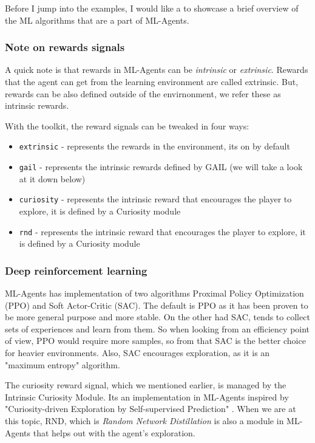 \documentclass[a4paper, 12pt]{book}
\begin{document}
Before I jump into the examples, I would like a to showcase a brief overview of the ML algorithms that are a part of ML-Agents.

\subsubsection{Note on rewards signals}

A quick note is that rewards in ML-Agents can be \emph{intrinsic} or \emph{extrinsic}. Rewards that the agent can get from the learning environment are called extrinsic. But, rewards can be also defined outside of the envirnonment, we refer these as intrinsic rewards.

With the toolkit, the reward signals can be tweaked in four ways:
\begin{itemize}
    \item \texttt{extrinsic} - represents the rewards in the environment, its on by default
    \item \texttt{gail} - represents the intrinsic rewards defined by GAIL (we will take a look at it down below)
    \item \texttt{curiosity} - represents the intrinsic reward that encourages the player to explore, it is defined by a Curiosity module
    \item \texttt{rnd} - represents the intrinsic reward that encourages the player to explore, it is defined by a Curiosity module
\end{itemize}

\subsubsection{Deep reinforcement learning}

ML-Agents has implementation of two algorithms Proximal Policy Optimization (PPO) and Soft Actor-Critic (SAC). The default is PPO as it has been proven to be more general purpose and more stable. On the other had SAC, tends to collect sets of experiences and learn from them. So when looking from an efficiency point of view, PPO would require more samples, so from that SAC is the better choice for heavier environments. Also, SAC encourages exploration, as it is an "maximum entropy" algorithm.

The curiosity reward signal, which we mentioned earlier, is managed by the Intrinsic Curiosity Module. Its an implementation in ML-Agents inspired by "Curiosity-driven Exploration by Self-supervised Prediction" \cite{CuriosityExploration}. When we are at this topic, RND, which is \emph{Random Network Distillation} \cite{ExplorationRND} is also a module in ML-Agents that helps out with the agent's exploration.
\end{document}
